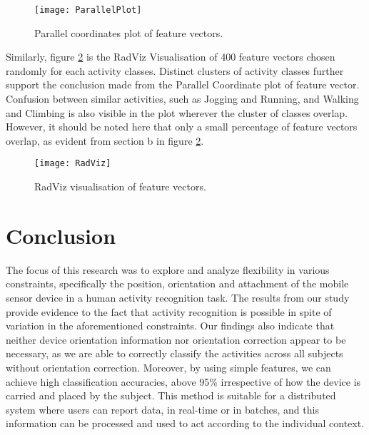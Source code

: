 \documentclass[
10pt,           %
a4paper,        %
oneside,        %
headinclude,footinclude, %
]{scrartcl}
\begin{document}
\begin{figure}[h!]
  \begin{center}
    \texttt{[image: ParallelPlot]}
  \end{center}
  \vspace{-10pt}
  \caption{\label{parallel_plot}Parallel coordinates plot of feature vectors.}
  \vspace{5pt}
\end{figure}


Similarly, figure \ref{radviz_plot} is the RadViz Visualisation \cite{Sharko2008}\cite{Bertini2005} of 400 feature vectors chosen randomly for each activity classes. Distinct clusters of activity classes further support the conclusion made from the Parallel Coordinate plot of feature vector. Confusion between similar activities, such as Jogging and Running, and Walking and Climbing is also visible in the plot wherever the cluster of classes overlap. However, it should be noted here that only a small percentage of feature vectors overlap, as evident from section b in figure \ref{radviz_plot}.

\begin{figure}[h!]
  \begin{center}
    \texttt{[image: RadViz]}
  \end{center}
  \vspace{-10pt}
  \caption{\label{radviz_plot}RadViz visualisation of feature vectors.}
  \vspace{-10pt}
\end{figure}


\newpage
\section{Conclusion}
The focus of this research was to explore and analyze flexibility in various constraints, specifically the position, orientation and attachment of the mobile sensor device in a human activity recognition task. The results from our study provide evidence to the fact that activity recognition is possible in spite of variation in the aforementioned constraints. Our findings also indicate that neither device orientation information nor orientation correction appear to be necessary, as we are able to correctly classify the activities across all subjects without orientation correction. Moreover, by using simple features, we can achieve high classification accuracies, above 95\% irrespective of how the device is carried and placed by the subject. This method is suitable for a distributed system where users can report data, in real-time or in batches, and this information can be processed and used to act according to the individual context.
\end{document}
